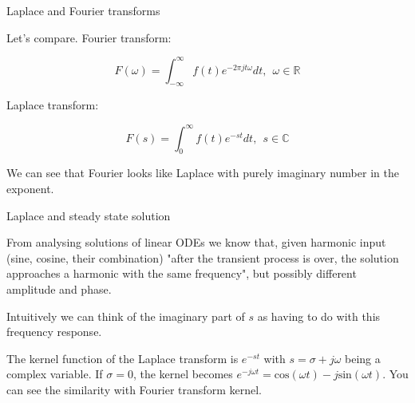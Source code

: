 \documentclass{beamer}
\begin{document}
\begin{frame}{Laplace and Fourier transforms}
\begin{flushleft}

Let's compare. Fourier transform:

\begin{equation}
    F(\omega) = \int_{-\infty}^\infty f(t) e^{-2\pi j t \omega} dt, \ \ \omega \in \mathbb{R}
\end{equation}

Laplace transform:

\begin{equation}
    F(s) = \int_0^\infty f(t) e^{-st}dt, \ \ s \in \mathbb{C}
\end{equation}

We can see that Fourier looks like Laplace with purely imaginary number in the exponent.

\end{flushleft}
\end{frame}







\begin{frame}{Laplace and steady state solution}
\begin{flushleft}

From analysing solutions of linear ODEs we know that, given harmonic input (sine, cosine, their combination) "after the transient process is over, the solution approaches a harmonic with the same frequency", but possibly different amplitude and phase.
 
\bigskip

Intuitively we can think of the imaginary part of $s$ as having to do with this frequency response. 

\bigskip
The kernel function of the Laplace transform is $e^{-st}$ with $s = \sigma + j \omega$ being a complex variable. If $\sigma = 0$, the kernel becomes $e^{-j \omega t} = \text{cos}(\omega t) - j \text{sin}(\omega t)$. You can see the similarity with Fourier transform kernel.


\end{flushleft}
\end{frame}
\end{document}
